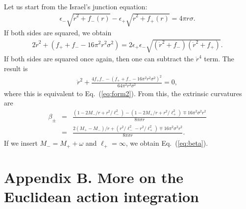 \documentclass[preprintnumbers,10pt,nofootinbib]{revtex4}
\begin{document}
Let us start from the Israel's junction equation:
\begin{eqnarray}
\epsilon_{-} \sqrt{\dot{r}^{2}+f_{-}(r)} - \epsilon_{+} \sqrt{\dot{r}^{2}+f_{+}(r)} = 4\pi r \sigma.
\end{eqnarray}
If both sides are squared, we obtain
\begin{eqnarray}
2\dot{r}^{2} + \left( f_{+} + f_{-} - 16 \pi^{2} r^{2} \sigma^{2} \right) = 2 \epsilon_{+} \epsilon_{-} \sqrt{\left( \dot{r}^{2} + f_{-} \right) \left( \dot{r}^{2} + f_{+} \right)}.
\end{eqnarray}
If both sides are squared once again, then one can subtract the $\dot{r}^{4}$ term. The result is
\begin{eqnarray}
\dot{r}^{2} + \frac{4f_{+}f_{-} - \left( f_{+} + f_{-} - 16 \pi^{2} r^{2} \sigma^{2} \right)^{2}}{64 \pi^{2} r^{2} \sigma^{2}} = 0,
\end{eqnarray}
where this is equivalent to Eq.~(\ref{eq:form2}). From this, the extrinsic curvatures are
\begin{eqnarray}
\beta_{\pm} &=& \frac{\left( 1 - 2M_{-}/r + r^{2}/\ell_{-}^{2} \right) - \left( 1 - 2M_{+}/r + r^{2}/\ell_{+}^{2} \right) \mp 16 \pi^{2} \sigma^{2} r^{2}}{8\pi \sigma r}\\
&=& \frac{2 \left(M_{+} - M_{-}\right)/r + \left( r^{2}/\ell_{-}^{2} - r^{2}/\ell_{+}^{2} \right) \mp 16 \pi^{2} \sigma^{2} r^{2}}{8\pi \sigma r}.
\end{eqnarray}
If we insert $M_{-} = M_{+} + \omega$ and $\ell_{+} = \infty$, we obtain Eq.~(\ref{eq:beta}).

\section*{Appendix B. More on the Euclidean action integration}
\end{document}
